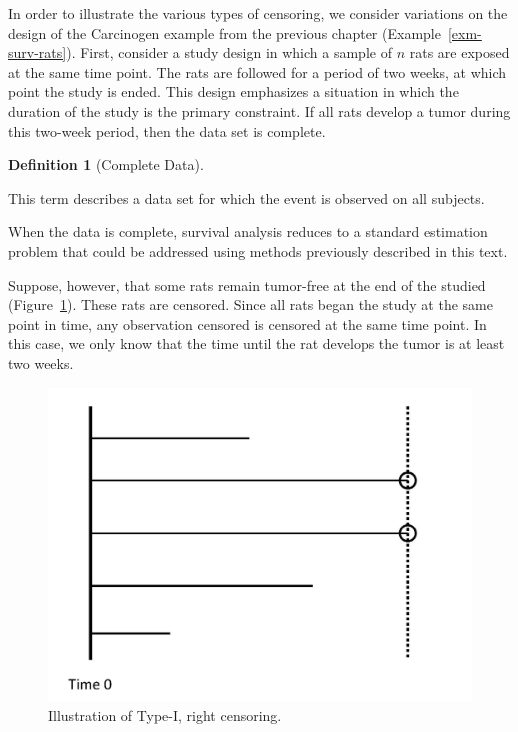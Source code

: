 \documentclass[
  letterpaper,
  DIV=11,
  numbers=noendperiod]{scrreprt}
\theoremstyle{definition}
\newtheorem{definition}{Definition}[chapter]
\theoremstyle{definition}
\theoremstyle{remark}
\begin{document}
In order to illustrate the various types of censoring, we consider
variations on the design of the Carcinogen example from the previous
chapter (Example~\ref{exm-surv-rats}). First, consider a study design in
which a sample of \(n\) rats are exposed at the same time point. The
rats are followed for a period of two weeks, at which point the study is
ended. This design emphasizes a situation in which the duration of the
study is the primary constraint. If all rats develop a tumor during this
two-week period, then the data set is complete.

\begin{definition}[Complete
Data]\protect\hypertarget{def-complete-data}{}\label{def-complete-data}

This term describes a data set for which the event is observed on all
subjects.

\end{definition}

When the data is complete, survival analysis reduces to a standard
estimation problem that could be addressed using methods previously
described in this text.

Suppose, however, that some rats remain tumor-free at the end of the
studied (Figure~\ref{fig-surv-censoring-type-1}). These rats are
censored. Since all rats began the study at the same point in time, any
observation censored is censored at the same time point. In this case,
we only know that the time until the rat develops the tumor is at least
two weeks.

\begin{figure}

{\centering \includegraphics{./images/censoring-type-1.jpg}

}

\caption{\label{fig-surv-censoring-type-1}Illustration of Type-I, right
censoring.}

\end{figure}
\end{document}
